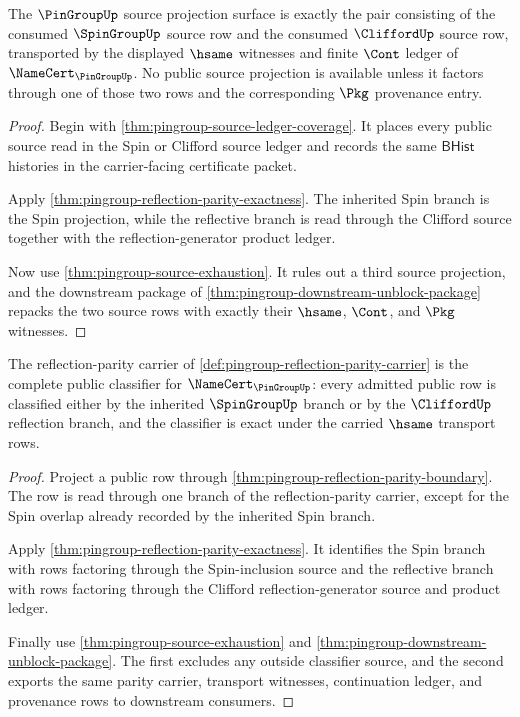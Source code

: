 \begin{theorem}
\label{thm:pingroup-source-projection-obligation}
The $\PinGroupUp$ source projection surface is exactly the pair consisting of
the consumed $\SpinGroupUp$ source row and the consumed $\CliffordUp$ source
row, transported by the displayed $\hsame$ witnesses and finite $\Cont$
ledger of $\NameCert_{\PinGroupUp}$. No public source projection is available
unless it factors through one of those two rows and the corresponding
$\Pkg$ provenance entry.
\end{theorem}
\begin{proof}
Begin with \autoref{thm:pingroup-source-ledger-coverage}. It places every
public source read in the Spin or Clifford source ledger and records the
same $\mathsf{BHist}$ histories in the carrier-facing certificate packet.

Apply \autoref{thm:pingroup-reflection-parity-exactness}. The inherited Spin
branch is the Spin projection, while the reflective branch is read through
the Clifford source together with the reflection-generator product ledger.

Now use \autoref{thm:pingroup-source-exhaustion}. It rules out a third source
projection, and the downstream package of
\autoref{thm:pingroup-downstream-unblock-package} repacks the two source
rows with exactly their $\hsame$, $\Cont$, and $\Pkg$ witnesses.
\end{proof}

\begin{theorem}
\label{thm:pingroup-parity-classifier-obligation}
The reflection-parity carrier of
\autoref{def:pingroup-reflection-parity-carrier} is the complete public
classifier for $\NameCert_{\PinGroupUp}$: every admitted public row is
classified either by the inherited $\SpinGroupUp$ branch or by the
$\CliffordUp$ reflection branch, and the classifier is exact under the
carried $\hsame$ transport rows.
\end{theorem}
\begin{proof}
Project a public row through
\autoref{thm:pingroup-reflection-parity-boundary}. The row is read through
one branch of the reflection-parity carrier, except for the Spin overlap
already recorded by the inherited Spin branch.

Apply \autoref{thm:pingroup-reflection-parity-exactness}. It identifies the
Spin branch with rows factoring through the Spin-inclusion source and the
reflective branch with rows factoring through the Clifford
reflection-generator source and product ledger.

Finally use \autoref{thm:pingroup-source-exhaustion} and
\autoref{thm:pingroup-downstream-unblock-package}. The first excludes any
outside classifier source, and the second exports the same parity carrier,
transport witnesses, continuation ledger, and provenance rows to downstream
consumers.
\end{proof}

